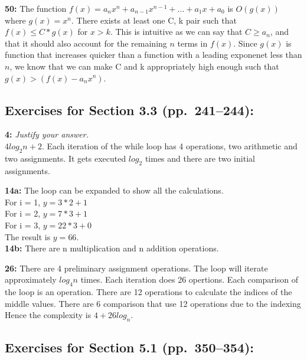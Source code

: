 \documentclass[12pt]{article}  %
\begin{document}
\noindent
{\bf 50:}
The function $f(x) = a_{n}x^n + a_{n-1}x^{n-1} + ... + a_{1}x + a_{0}$ is $O(g(x))$ where 
$g(x) = x^n$.
There exists at least one C, k pair such that $f(x) \leq C*g(x)$ for $x > k$. 
This is intuitive as we can say that $C \geq a_{n}$, and that it should also
account for the remaining $n$ terms in $f(x)$. Since $g(x)$ is function that
increases quicker than a function with a leading exponenet less than $n$, we know
that we can make C and k appropriately high enough such that $g(x) > (f(x) - a_{n}x^n)$.


\subsection*{Exercises for Section 3.3 (pp.\ 241--244):}     

\noindent
{\bf 4:} {\em Justify your answer.}\\
$4 log_{2} n + 2$. Each iteration of the while loop has 4 operations, 
two arithmetic and two assignments. It gets executed $log_{2}$ times and
there are two initial assignments.

\noindent
{\bf 14a:}
The loop can be expanded to show all the calculations.
\\
For i = 1, $y = 3*2 + 1$\\
For i = 2, $y = 7*3 + 1$\\
For i = 3, $y = 22*3 + 0$\\
The result is $y = 66$.
\\
{\bf 14b:}
There are n multiplication and n addition operations.

\noindent
{\bf 26:}
There are 4 preliminary assignment operations. The loop will iterate approximately
$log_{4}n$ times. Each iteration does 26 opertions. Each comparison of the loop
is an operation. There are 12 operations to calculate the indices of the
middle values. There are 6 comparison that use 12 operations due to the indexing
Hence the complexity is $4 + 26log_{n}$.


\subsection*{Exercises for Section 5.1 (pp.\ 350--354):}     
\end{document}
